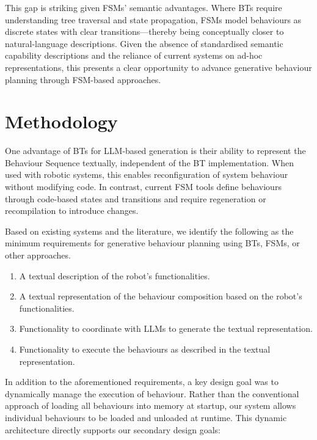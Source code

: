 \documentclass[letterpaper, 10pt, conference]{ieeeconf}      %
\begin{document}
This gap is striking given FSMs' semantic advantages. Where BTs require understanding tree traversal and state propagation, FSMs model behaviours as discrete states with clear transitions—thereby being conceptually closer to natural-language descriptions. Given the absence of standardised semantic capability descriptions and the reliance of current systems on ad-hoc representations, this presents a clear opportunity to advance generative behaviour planning through FSM-based approaches.


\section{Methodology}

One advantage of BTs for LLM-based generation is their ability to represent the Behaviour Sequence textually, independent of the BT implementation. When used with robotic systems, this enables reconfiguration of system behaviour without modifying code. In contrast, current FSM tools define behaviours through code-based states and transitions and require regeneration or recompilation to introduce changes.

Based on existing systems and the literature, we identify the following as the minimum requirements for generative behaviour planning using BTs, FSMs, or other approaches.

\begin{enumerate}
    \item A textual description of the robot's functionalities.
    \item A textual representation of the behaviour composition based on the robot's functionalities.
    \item Functionality to coordinate with LLMs to generate the textual representation.
    \item Functionality to execute the behaviours as described in the textual representation.
\end{enumerate}

In addition to the aforementioned requirements, a key design goal was to dynamically manage the execution of behaviour. Rather than the conventional approach of loading all behaviours into memory at startup, our system allows individual behaviours to be loaded and unloaded at runtime. This dynamic architecture directly supports our secondary design goals:
\end{document}
